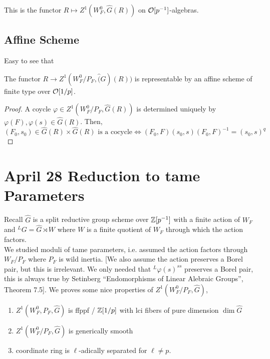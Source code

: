 \documentclass[12pt]{article}
\begin{document}
\begin{rmk}
This is the functor $R \mapsto Z^1(W_F^0, \hat{G}(R))$ on $\mathcal{O}[p^{-1}]$-algebras. 
\end{rmk}

\subsection{Affine Scheme}

Easy to see that

\begin{lemma}
The functor $R \to Z^1(W_F^0/P_F, \hat(G)(R))$ is representable by an affine scheme of finite type over $\mathcal{O}[1/p]$.
\end{lemma}

\begin{proof}
A coycle $\varphi \in Z^1(W_F^0 / P_F, \hat{G}(R))$ is determined uniquely by $\varphi(F), \varphi(s) \in \hat{G}(R)$. Then,
\[ (F_0, s_0) \in \hat{G}(R) \times \hat{G}(R) \text{ is a cocycle} \iff (F_0, F)(s_0, s)(F_0, F)^{-1} = (s_0, s)^q \]
\end{proof}

\section{April 28 Reduction to tame Parameters}

\newcommand{\ok}{\mathcal{O}_{K_e}}

Recall $\hat{G}$ is a split reductive group scheme over $\mathbb{Z}[p^{-1}]$ with a finite action of $W_F$ and ${}^L G = \hat{G} \rtimes W$ where $W$ is a finite quotient of $W_F$ through which the action factors. 
\bigskip\\
We studied moduli of tame parameters, i.e. assumed the action factors through $W_F / P_F$ where $P_F$ is wild inertia. [We also assume the action preserves a Borel pair, but this is irrelevant. We only needed that ${}^L \varphi(s)^{ss}$ preserves a Borel pair, this is always true by Setinberg ``Endomorphisms of Linear Alebraic Groups'', Theorem 7.5]. We proves some nice properties of $Z^1(W_F^0 / P_F, \hat{G})$,
\begin{enumerate}
\item $Z^1(W_F^0, P_F, \hat{G})$ is ffppf / $\mathbb{Z}[1/p]$ with lci fibers of pure dimension $\dim{\hat{G}}$
\item $Z^1(W_F^0 / P_F, \hat{G})$ is generically smooth
\item coordinate ring is $\ell$-adically separated for $\ell \neq p$.
\end{enumerate}
\end{document}
